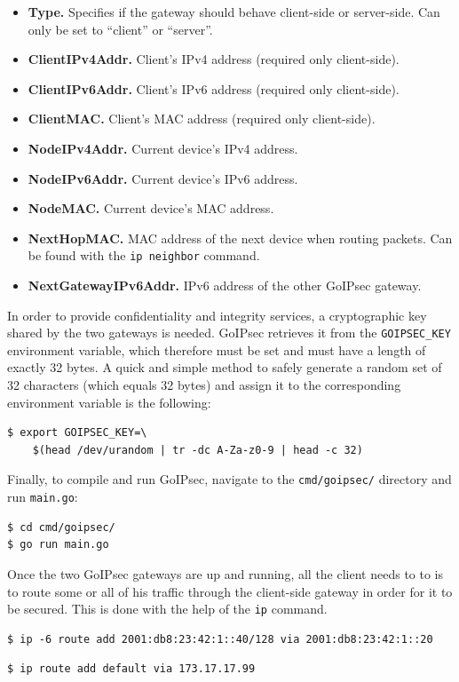 \documentclass[a4paper,12pt]{report}
\newcommand{\quotes}[1]{``#1''}
\begin{document}
		\begin{itemize}
		\item \textbf{Type.} Specifies if the gateway should behave client-side or server-side. Can only be set to \quotes{client} or \quotes{server}.
		\item \textbf{ClientIPv4Addr.} Client's IPv4 address (required only client-side).
		\item \textbf{ClientIPv6Addr.} Client's IPv6 address (required only client-side).
		\item \textbf{ClientMAC.} Client's MAC address (required only client-side).
		\item \textbf{NodeIPv4Addr.} Current device's IPv4 address.
		\item \textbf{NodeIPv6Addr.} Current device's IPv6 address.
		\item \textbf{NodeMAC.} Current device's MAC address.
		\item \textbf{NextHopMAC.} MAC address of the next device when routing packets. Can be found with the \texttt{ip neighbor} command.
		\item \textbf{NextGatewayIPv6Addr.} IPv6 address of the other GoIPsec gateway.
		\end{itemize}
		
		In order to provide confidentiality and integrity services, a cryptographic key shared by the two gateways is needed. GoIPsec retrieves it from the \texttt{GOIPSEC\_KEY} environment variable, which therefore must be set and must have a length of exactly 32 bytes. A quick and simple method to safely generate a random set of 32 characters (which equals 32 bytes) and assign it to the corresponding environment variable is the following:
		\begin{lstlisting}[caption=Randomly generate \texttt{GOIPSEC\_KEY}.]
$ export GOIPSEC_KEY=\
	$(head /dev/urandom | tr -dc A-Za-z0-9 | head -c 32)
		\end{lstlisting}
		Finally, to compile and run GoIPsec, navigate to the \texttt{cmd/goipsec/} directory and run \texttt{main.go}:
		\begin{lstlisting}[caption=Compile and run GoIPsec.]
$ cd cmd/goipsec/
$ go run main.go
		\end{lstlisting}
		Once the two GoIPsec gateways are up and running, all the client needs to to is to route some or all of his traffic through the client-side gateway in order for it to be secured. This is done with the help of the \texttt{ip} command.
				\begin{lstlisting}[caption=Route IPv6 traffic destined for \texttt{2001:db8:23:42:1::40} through the GoIPsec gateway available at \texttt{2001:db8:23:42:1::20}.]
$ ip -6 route add 2001:db8:23:42:1::40/128 via 2001:db8:23:42:1::20
		\end{lstlisting}
\newpage
			\begin{lstlisting}[caption=Route all IPv4 traffic through the GoIPsec gateway with address \texttt{173.17.17.99}.]
$ ip route add default via 173.17.17.99
		\end{lstlisting}
		
\end{document}
